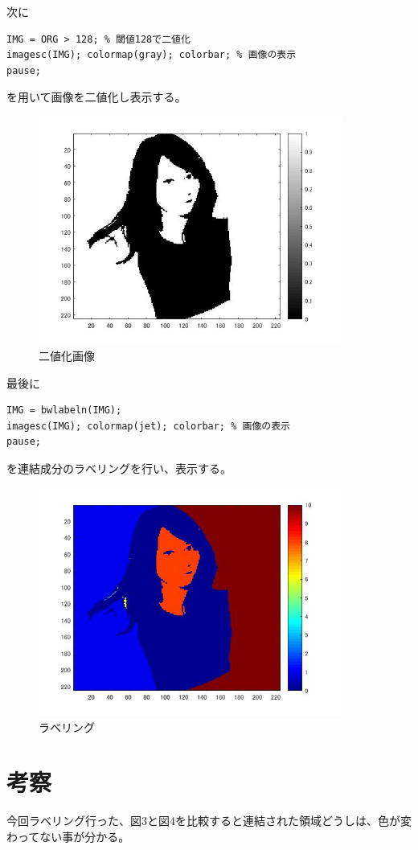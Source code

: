 \documentclass{jsarticle}
\begin{document}
次に
\begin{lstlisting}[basicstyle=\ttfamily\footnotesize, frame=single]
IMG = ORG > 128; % 閾値128で二値化
imagesc(IMG); colormap(gray); colorbar; % 画像の表示
pause;
 \end{lstlisting}
を用いて画像を二値化し表示する。

\newpage
\begin{figure}[htbp]
 \begin{center}
  \includegraphics[width=10cm]{8-1.jpg}
 \end{center}
 \caption{二値化画像}
\end{figure}

最後に
\begin{lstlisting}[basicstyle=\ttfamily\footnotesize, frame=single]
IMG = bwlabeln(IMG);
imagesc(IMG); colormap(jet); colorbar; % 画像の表示
pause;
 \end{lstlisting}
を連結成分のラベリングを行い、表示する。

\newpage
\begin{figure}[htbp]
 \begin{center}
  \includegraphics[width=10cm]{8-2.jpg}
 \end{center}
 \caption{ラベリング}
\end{figure}


\section{考察}
今回ラベリング行った、図3と図4を比較すると連結された領域どうしは、色が変わってない事が分かる。
\end{document}
